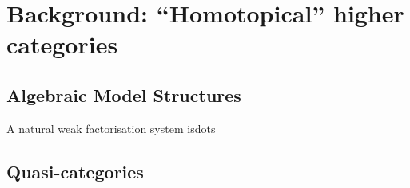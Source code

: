 
\chapter{Background: ``Homotopical'' higher categories}



\section{Algebraic Model Structures}

\para A natural weak factorisation system is\;dots

\para 

\section{Quasi-categories}




